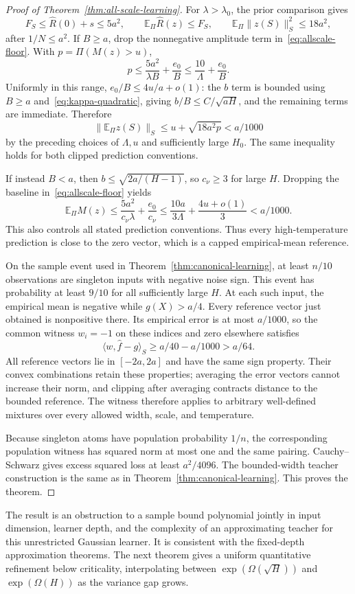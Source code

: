 \begin{proof}[Proof of Theorem~\ref{thm:all-scale-learning}]
For $\lambda>\lambda_0$, the prior comparison gives
\[
 F_S\le\widehat R(0)+s\le5a^2,
 \qquad \mathbb E_\Pi\widehat R(z)\le F_S,
 \qquad \mathbb E_\Pi\|z(S)\|_S^2\le18a^2,
\]
after $1/N\le a^2$. If $B\ge a$, drop the nonnegative amplitude term in~\eqref{eq:allscale-floor}. With $p=\Pi(M(z)>u)$,
\[
 p\le\frac{5a^2}{\lambda B}+\frac{e_0}B
       \le\frac{10}{\Lambda}+\frac{e_0}B.
\]
Uniformly in this range, $e_0/B\le4u/a+o(1)$: the $b$ term is bounded using $B\ge a$ and~\eqref{eq:kappa-quadratic}, giving $b/B\le C/\sqrt{aH}$, and the remaining terms are immediate. Therefore
\[
 \|\mathbb E_\Pi z(S)\|_S
 \le u+\sqrt{18a^2p}<a/1000
\]
by the preceding choices of $\Lambda,u$ and sufficiently large $H_0$. The same inequality holds for both clipped prediction conventions.

If instead $B<a$, then $b\le\sqrt{2a/(H-1)}$, so $c_\nu\ge3$ for large $H$. Dropping the baseline in~\eqref{eq:allscale-floor} yields
\[
 \mathbb E_\Pi M(z)
 \le\frac{5a^2}{c_\nu\lambda}+\frac{e_0}{c_\nu}
 \le\frac{10a}{3\Lambda}+\frac{4u+o(1)}3<a/1000.
\]
This also controls all stated prediction conventions. Thus every high-temperature prediction is close to the zero vector, which is a capped empirical-mean reference.

On the sample event used in Theorem~\ref{thm:canonical-learning}, at least $n/10$ observations are singleton inputs with negative noise sign. This event has probability at least $9/10$ for all sufficiently large $H$. At each such input, the empirical mean is negative while $g(X)>a/4$. Every reference vector just obtained is nonpositive there. Its empirical error is at most $a/1000$, so the common witness $w_i=-1$ on these indices and zero elsewhere satisfies
\[
 \langle w,\widehat f-g\rangle_S
 \ge a/40-a/1000>a/64.
\]
All reference vectors lie in $[-2a,2a]$ and have the same sign property. Their convex combinations retain these properties; averaging the error vectors cannot increase their norm, and clipping after averaging contracts distance to the bounded reference. The witness therefore applies to arbitrary well-defined mixtures over every allowed width, scale, and temperature.

Because singleton atoms have population probability $1/n$, the corresponding population witness has squared norm at most one and the same pairing. Cauchy--Schwarz gives excess squared loss at least $a^2/4096$. The bounded-width teacher construction is the same as in Theorem~\ref{thm:canonical-learning}. This proves the theorem.
\end{proof}

The result is an obstruction to a sample bound polynomial jointly in input dimension, learner depth, and the complexity of an approximating teacher for this unrestricted Gaussian learner. It is consistent with the fixed-depth approximation theorems. The next theorem gives a uniform quantitative refinement below criticality, interpolating between $\exp(\Omega(\sqrt H))$ and $\exp(\Omega(H))$ as the variance gap grows.
